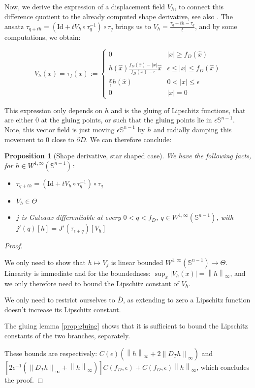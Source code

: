 \documentclass[english,a4paper,12pt,oneside]{scrbook}
\theoremstyle{break}
\newtheorem{prop}[equation]{Proposition}
\newenvironment{mproof}[1][\proofname]{%
  \begin{proof}[#1]$ $\par\nobreak\ignorespaces
}{%
  \end{proof}
}
\renewcommand*{\proofname}{Proof}
\theoremstyle{remark}
\newcommand{\mS}{\mathbb{S}^{n-1}}
\newcommand{\ds}{\displaystyle}
\newcommand{\norm}[1]{\left\lVert#1\right\rVert}
\newcommand{\id}{\text{Id}}
\newcommand{\Te}{\Theta}
\newcommand{\xh}{\hat{x}}
\newcommand{\eps}{\epsilon}
\begin{document}
Now, we derive the expression of a displacement field $V_h$, to connect this difference quotient to the already computed shape derivative, see also \cite{deckelnick}. The ansatz $\tau_{q+th}=(\id + tV_h\circ \tau_q^{-1})\circ \tau_q$ brings us to $V_h = \ds \frac{\tau_q+th-\tau_q}{t}$, and by some computations, we obtain: 

$$V_h(x) = \tau_f(x):=\left\{\begin{matrix}
 0 & |x|\geq f_D(\xh)\\ 
 h(\xh)\frac{f_D(\xh)-|x|}{f_D(\xh)-\eps}\xh & \eps \leq |x| \leq f_D(\xh) \\ 
 \frac{x}{\epsilon}h(\hat{x}) & 0<|x|\leq \eps\\ 
 0 & |x|=0
\end{matrix}\right.$$

This expression only depends on $h$ and is the gluing of Lipschitz functions, that are either $0$ at the gluing points, or such that the gluing points lie in $\eps\mS$. Note, this vector field is just moving $\eps \mS$ by $h$ and radially damping this movement to $0$ close to $\partial D$. We can therefore conclude:

\begin{prop}[Shape derivative, star shaped case]
We have the following facts, for $h \in W^{1,\infty}(\mS)$:

\begin{itemize}
	\item $\tau_{q+th}=(\id + tV_h\circ \tau_q^{-1})\circ \tau_q$
	\item $V_h \in \Te$
	\item $j$ is Gateaux differentiable at every $0<q<f_D$, $q \in W^{1,\infty}(\mS)$, with $j'(q)[h] = J'(\tau_{\eps+q})[V_h]$
\end{itemize}

\end{prop}
\begin{mproof}

We only need to show that $h\mapsto V_j$ is linear bounded $W^{1,\infty}(\mS)\rightarrow \Te$. Linearity is immediate and for the boundedness: $\sup_x|V_h(x)| = \norm{h}_\infty$, and we only therefore need to bound the Lipschitz constant of $V_h$. 

We only need to restrict ourselves to $\overline{D}$, as extending to zero a Lipschitz function doesn't increase its Lipschitz constant.

The gluing lemma \cref{prop:gluing} shows that it is sufficient to bound the Lipschitz constants of the two branches, separately.

These bounds are respectively: $C(\eps)(\norm{h}_\infty + 2\norm{D_T h}_\infty)$ and $[2\eps^{-1}(\norm{D_T h}_\infty + \norm{h}_\infty)]C(f_D,\eps) + C(f_D,\eps)\norm{h}_\infty$, which concludes the proof.

\end{mproof}
\end{document}
